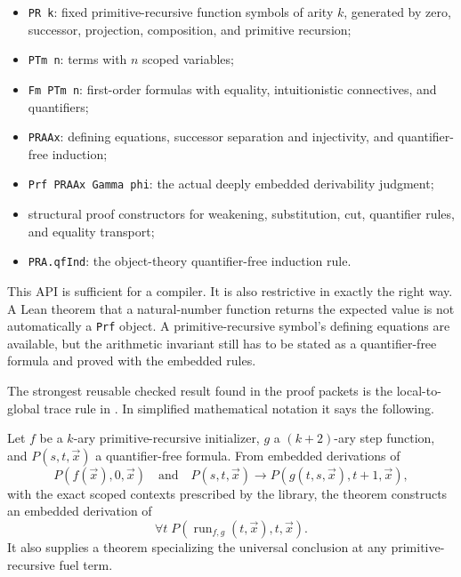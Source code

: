 \begin{itemize}
\item \texttt{PR k}: fixed primitive-recursive function symbols of arity
\(k\), generated by zero, successor, projection, composition, and primitive
recursion;
\item \texttt{PTm n}: terms with \(n\) scoped variables;
\item \texttt{Fm PTm n}: first-order formulas with equality, intuitionistic
connectives, and quantifiers;
\item \texttt{PRAAx}: defining equations, successor separation and
injectivity, and quantifier-free induction;
\item \texttt{Prf PRAAx Gamma phi}: the actual deeply embedded derivability
judgment;
\item structural proof constructors for weakening, substitution, cut,
quantifier rules, and equality transport;
\item \texttt{PRA.qfInd}: the object-theory quantifier-free induction rule.
\end{itemize}

This API is sufficient for a compiler.  It is also restrictive in exactly the
right way.  A Lean theorem that a natural-number function returns the expected
value is not automatically a \texttt{Prf} object.  A primitive-recursive
symbol's defining equations are available, but the arithmetic invariant still
has to be stated as a quantifier-free formula and proved with the embedded
rules.

The strongest reusable checked result found in the proof packets is the
local-to-global trace rule in
.  In simplified
mathematical notation it says the following.

\begin{theorem}
\label{thm:existing-trace}
Let \(f\) be a \(k\)-ary primitive-recursive initializer, \(g\) a
\((k+2)\)-ary step function, and \(P(s,t,\vec x)\) a quantifier-free formula.
From embedded derivations of
\[
P(f(\vec x),0,\vec x)
\quad\text{and}\quad
P(s,t,\vec x)\longrightarrow P(g(t,s,\vec x),t+1,\vec x),
\]
with the exact scoped contexts prescribed by the library, the theorem
constructs an embedded derivation of
\[
\forall t\;P(\operatorname{run}_{f,g}(t,\vec x),t,\vec x).
\]
It also supplies a theorem specializing the universal conclusion at any
primitive-recursive fuel term.
\end{theorem}

